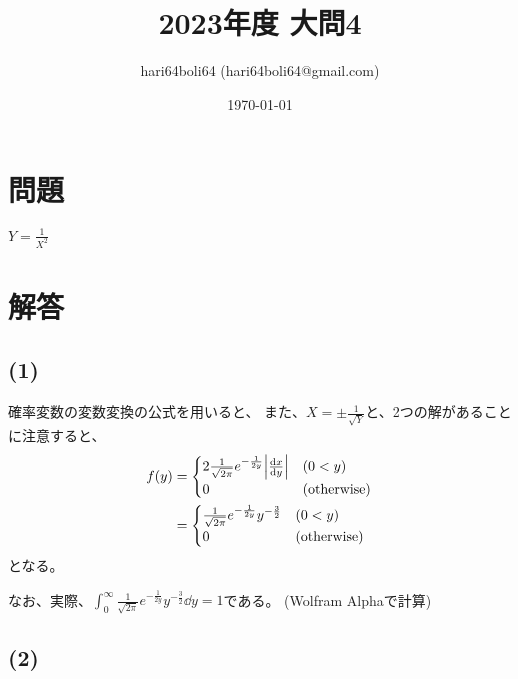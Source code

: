 \documentclass[a4paper, 10pt, dvipdfmx]{jlreq}
\begin{document}
\title{2023年度 大問4}
\author{hari64boli64 (hari64boli64@gmail.com)}
\date{\today}
\maketitle

\section{問題}

$Y=\frac{1}{X^2}$

\section{解答}

\subsection*{(1)}

確率変数の変数変換の公式を用いると、
また、$X=\pm\frac{1}{\sqrt{Y}}$と、2つの解があることに注意すると、
\begin{align*}
  f(y) & = \begin{cases}
             2 \frac{1}{\sqrt{2\pi}}e^{-\frac{1}{2y}} \abs{\dv{x}{y}} & (0<y)              \\
             0                                                        & (\text{otherwise})
           \end{cases} \\
       & = \begin{cases}
             \frac{1}{\sqrt{2\pi}}e^{-\frac{1}{2y}} y^{-\frac{3}{2}} & (0<y)              \\
             0                                                       & (\text{otherwise})
           \end{cases}
\end{align*}
となる。

なお、実際、$\int_0^{\infty}\frac{1}{\sqrt{2\pi}}e^{-\frac{1}{2y}} y^{-\frac{3}{2}}\dd{y}=1$である。
(Wolfram Alphaで計算)

\subsection*{(2)}
\end{document}
